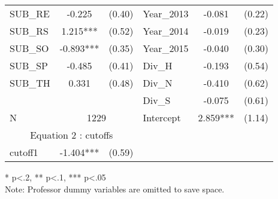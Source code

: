 \begin{table}[htb]
\begin{threeparttable}
\begin{tabular}{l c c|l c c }
    SUB\_RE                                      & -0.225                     & (0.40)               & Year\_2013               & -0.081                 & (0.22)               \\
    SUB\_RS                                      & 1.215***                   & (0.52)               & Year\_2014               & -0.019                 & (0.23)               \\
    SUB\_SO                                      & -0.893***                  & (0.35)               & Year\_2015               & -0.040                 & (0.30)               \\
    SUB\_SP                                      & -0.485                     & (0.41)               & Div\_H              & -0.193                 & (0.54)               \\
    SUB\_TH                                      & 0.331                      & (0.48)               & Div\_N              & -0.410                 & (0.62)               \\
                                                 &                            &                      & Div\_S              & -0.075                 & (0.61)               \\
    \cline{1-3}
      N                                          & \multicolumn{2}{|c|}{1229} & Intercept            & 2.859***            & (1.14)                                        \\
    \cline{1-3}
    \multicolumn{3}{c|}{Equation 2 : cutoffs}    &                            &                      &                                                                     \\
    \cline{1-3}
    cutoff1                                      & -1.404***                  & (0.59)               &                     &                        &                      \\
    \hline 
    \hline
  \end{tabular}
  \begin{tablenotes}
  \item{* p<.2, ** p<.1, *** p<.05 \\ Note: Professor dummy variables are omitted to save space.}
  \end{tablenotes}
  \centering\thepage
  \end{threeparttable}
\end{table}

\clearpage{}

\newpage{}

